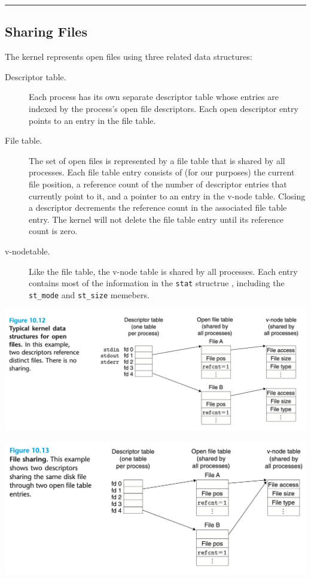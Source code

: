 \documentclass[11pt]{article}
\begin{document}
\noindent\rule{\textwidth}{0.5pt}



\subsection{Sharing Files}
\label{sec:org8f2d91f}
The kernel represents open files using three related data structures:\\
\begin{description}
\item[{Descriptor table.}] Each process has its own separate descriptor table whose entries are indexed by the process’s open file descriptors. Each open descriptor entry points to an entry in the file table.\\
\item[{File table.}] The set of open files is represented by a file table that is shared by all processes. Each file table entry consists of (for our purposes) the current file position, a reference count of the number of descriptor entries that currently point to it, and a pointer to an entry in the v-node table. Closing a descriptor decrements the reference count in the associated file table entry. The kernel will not delete the file table entry until its reference count is zero.\\
\item[{v-nodetable.}] Like the file table, the v-node table is shared by all processes. Each entry contains most of the information in the \texttt{stat} structrue , including the \texttt{st\_mode} and \texttt{st\_size} memebers.\\
\end{description}

\begin{center}
\includegraphics[width=.9\linewidth]{pics/figure10.12-typical-kernel-data-structure-for-open-files.png}
\end{center}

\begin{center}
\includegraphics[width=.9\linewidth]{pics/figure10.13-file-sharing.png}
\end{center}
\end{document}
